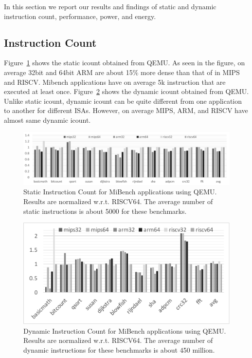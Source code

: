 
\label{sec:expt}

In this section we report our results and findings of static and dynamic instruction count, performance, power, and energy. 

\subsection{Instruction Count}
Figure~\ref{fig:static} shows the static icount obtained from QEMU. As seen in the figure, on average 32bit and 64bit ARM are about 15\% more dense than that of in MIPS and RISCV. Mibench applications have on average 5k instruction that are executed at least once. Figure~\ref{fig:dynamic} shows the dynamic icount obtained from QEMU. Unlike static icount, dynamic icount can be quite different from one application to another for different ISAs. However, on average MIPS, ARM, and RISCV have almost same dynamic icount. 

\begin{figure}[htb]
	\centering
	\includegraphics[width=1.9\columnwidth]{figures/static.pdf}
	\caption{Static Instruction Count for MiBench applications using QEMU. Results are normalized w.r.t. RISCV64. The average number of static instructions is about 5000 for these benchmarks.}
	\label{fig:static}
\end{figure} 

\begin{figure}[htb]
	\centering
	\includegraphics[width=1\columnwidth]{figures/dynamic.pdf}
	\caption{Dynamic Instruction Count for MiBench applications using QEMU. Results are normalized w.r.t. RISCV64. The average number of dynamic instructions for these benchmarks is about 450 million.}
	\label{fig:dynamic}
	\vspace{-1em}
\end{figure} 

